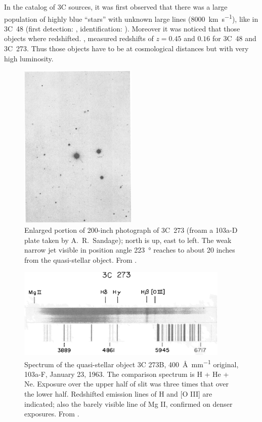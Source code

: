 \documentclass[10pt,a4paper,english]{article}
\begin{document}
In the catalog of 3C sources, it was first observed that there was a large
population of highly blue “stars” with unknown large lines
(\SI{8000}{\km\per\s}), like in 3C~48 (first detection: \citet{Matthews1960},
identification: \citet{1963ApJ-138-30M}). Moreover it was noticed that those
objects where redshifted. \citet{1964ApJ-140-1G}, measured redshifts of
$z=0.45$ and $0.16$ for 3C~48 and 3C~273. Thus those objects have to be at
cosmological distances but with very high luminosity.

\begin{figure}[!ht]
    \centering
    \includegraphics[width=0.5\textwidth,clip,trim=50mm 130mm 50mm 260mm]{1964ApJ-140-1G_1.jpg} %
    \caption{
        Enlarged portion of 200-inch photograph of 3C~273 (froam a 103a-D plate
        taken by A.~R.~Sandage); north is up, east to left. The weak narrow jet
        visible in position angle \SI{223}{\degree} reaches to about 20 inches
        from the quasi-stellar object. From \cite{1964ApJ-140-1G}.
    }
\end{figure}

\begin{figure}[!ht]
    \centering
    \includegraphics[width=0.9\textwidth]{1964ApJ-140-1G_2.jpg}
    \caption{
        Spectrum of the quasi-stellar object 3C 273B,
        \SI{400}{\angstrom\per\mm} original, 103a-F, January 23, 1963. The
        comparison spectrum is H + He + Ne. Exposure over the upper half of
        slit was three times that over the lower half. Redshifted emission
        lines of H and [O \textsc{III}] are indicated; also the barely visible
        line of Mg \textsc{II}, confirmed on denser exposures. From
        \cite{1964ApJ-140-1G}.
    }
\end{figure}
\end{document}
